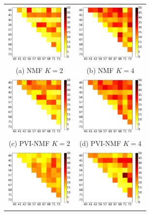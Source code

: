 \begin{figure}[H]
\begin{center}
\begin{tabular}{cc}
    \includegraphics[width=35mm]{Chapters/dafx/figures/PEASSplots/OPS/NMF2.png} & \includegraphics[width=35mm]{Chapters/dafx/figures/PEASSplots/OPS/NMF4.png} \\
    (a) NMF $K=2$ & (b) NMF $K=4$ \\[6pt]
        \includegraphics[width=35mm]{Chapters/dafx/figures/PEASSplots/OPS/NMFWARP2.png} & \includegraphics[width=35mm]{Chapters/dafx/figures/PEASSplots/OPS/NMFWARP4.png} \\
    (c) PVI-NMF $K=2$ & (d) PVI-NMF $K=4$ \\[6pt]
         \includegraphics[width=35mm]{Chapters/dafx/figures/PEASSplots/OPS/NTF2.png} & \includegraphics[width=35mm]{Chapters/dafx/figures/PEASSplots/OPS/NTF4.png} \\

\end{tabular}
\end{center}
\end{figure}
